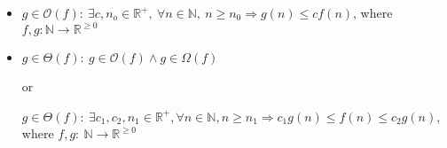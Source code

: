 \documentclass[12pt]{article}
\begin{document}
\begin{enumerate}[1.]
\begin{enumerate}[a)]
\begin{itemize}
            \item

            $g \in \mathcal{O}(f):\:\exists c,n_o \in \mathbb{R}^{+},\:\forall n \in
            \mathbb{N},\:n \geq n_0 \Rightarrow g(n) \leq cf(n)$, where $f,g:\mathbb{N} \to \mathbb{R}^{\geq 0}$

            \item

            $g \in \Theta(f):\: g \in \mathcal{O}(f) \land g \in \Omega(f)$

            or

            $g \in \Theta(f):\:\exists c_1,c_2,n_1 \in \mathbb{R}^{+}, \forall n \in \mathbb{N}, n \geq n_1
            \Rightarrow c_1g(n) \leq f(n) \leq c_2g(n)$, where $f,g:\:\mathbb{N} \to \mathbb{R}^{\geq 0}$
        \end{itemize}
    \end{enumerate}
\end{enumerate}
\end{document}
